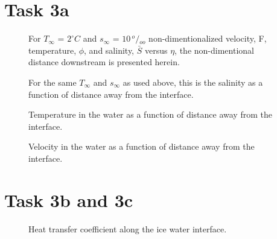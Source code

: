 \section*{Task 3a} %
\label{sec:Task 3a}
	
	\begin{figure}[h]
		\begin{center}
			\newlength\figureheight 
			\newlength\figurewidth 
			\setlength\figureheight{6cm} 
			\setlength\figurewidth{9cm} 
			
		\end{center}
		\caption{For $T_\infty$ = $2^\circ C$ and $s_\infty$ = $10 \, {}^o/{}_{oo}$ non-dimentionalized velocity, F, temperature, $\phi$, and salinity, $\bar{S}$ versus $\eta$, the non-dimentional distance downstream is presented herein.}
		\label{fig:etaVsF_phi_S_3a}
	\end{figure}
	
	\begin{figure}[h]
		\begin{center}
			\setlength\figureheight{6cm} 
			\setlength\figurewidth{9cm} 
			
		\end{center}
		\caption{For the same $T_\infty$ and $s_\infty$ as used above, this is the salinity as a function of distance away from the interface.}
		\label{fig:salinity_3a}
	\end{figure}
	
	\begin{figure}[h]
		\begin{center}
			\setlength\figureheight{6cm} 
			\setlength\figurewidth{9cm} 
			
		\end{center}
		\caption{Temperature in the water as a function of distance away from the interface.}
		\label{fig:temperture_3a}
	\end{figure}
	
	\begin{figure}[h]
		\begin{center}
			\setlength\figureheight{6cm} 
			\setlength\figurewidth{9cm} 
			
		\end{center}
		\caption{Velocity in the water as a function of distance away from the interface.}
		\label{fig:salinity_3a}
	\end{figure}
	
\section*{Task 3b and 3c}
	\begin{figure}[h]
		\begin{center}
			\setlength\figureheight{6cm} 
			\setlength\figurewidth{9cm} 
			
		\end{center}
		\caption{Heat transfer coefficient along the ice water interface.}
		\label{fig:temperture_3a}
	\end{figure}
	
